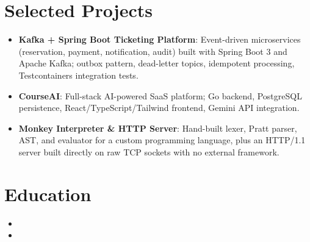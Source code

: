 \documentclass[11pt,a4paper,sans]{moderncv}
\begin{document}
\section{Selected Projects}
\vspace{1pt}
\begin{itemize}

\item \textbf{Kafka + Spring Boot Ticketing Platform}: Event-driven microservices (reservation, payment, notification, audit) built with Spring Boot 3 and Apache Kafka; outbox pattern, dead-letter topics, idempotent processing, Testcontainers integration tests.

\item \textbf{CourseAI}: Full-stack AI-powered SaaS platform; Go backend, PostgreSQL persistence, React/TypeScript/Tailwind frontend, Gemini API integration.

\item \textbf{Monkey Interpreter \& HTTP Server}: Hand-built lexer, Pratt parser, AST, and evaluator for a custom programming language, plus an HTTP/1.1 server built directly on raw TCP sockets with no external framework.

\end{itemize}


\section{Education}
\vspace{1pt}
\begin{itemize}

\item{}

\vspace{3pt}

\item{}

\end{itemize}
\end{document}
